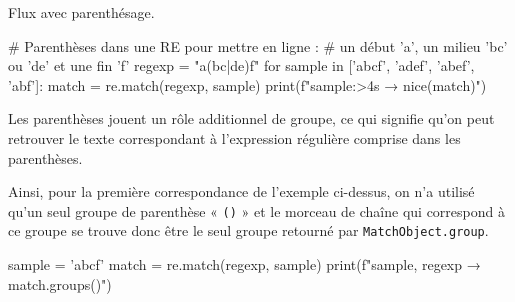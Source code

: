 \begin{marginfigure}
\centering
{}
\caption{\label{fig:XI.3}Flux avec parenthésage.}
\end{marginfigure}

\begin{idleconsole}
	\begin{pyconsole}
# Parenthèses dans une RE pour mettre en ligne :
# un début 'a', un milieu 'bc' ou 'de' et une fin 'f'
regexp = "a(bc|de)f"
for sample in ['abcf', 'adef',  'abef', 'abf']:
    match = re.match(regexp, sample)
    print(f"{sample:>4s} → {nice(match)}")

	\end{pyconsole}
\end{idleconsole}

Les parenthèses jouent un rôle additionnel de groupe, ce qui signifie qu'on peut retrouver le texte correspondant à l'expression régulière comprise dans les parenthèses. 

Ainsi, pour la première correspondance de l'exemple ci-dessus, on n'a utilisé qu'un seul groupe de parenthèse « \texttt{()} » et le morceau de chaîne qui correspond à ce groupe se trouve donc être le seul groupe retourné par \texttt{MatchObject.group}.

\begin{idleconsole}
	\begin{pyconsole}
sample = 'abcf'
match = re.match(regexp, sample)
print(f"{sample}, {regexp} → {match.groups()}")
	\end{pyconsole}
\end{idleconsole}

